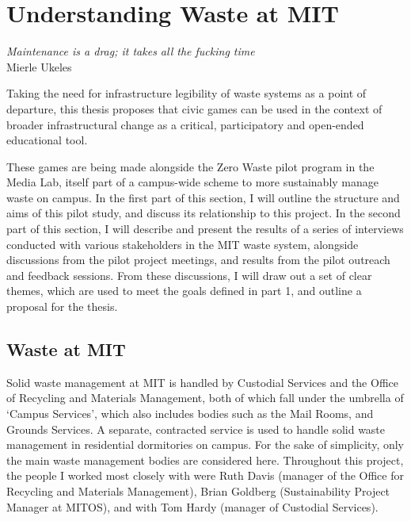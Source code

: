 \documentclass[nofonts,nols,justified,nobib]{tufte-book}
\begin{document}


\chapter{Understanding Waste at MIT}

\begin{flushright}
\emph{Maintenance is a drag; it takes all the fucking time} \cite{ukeles_manifesto_1969}\\
Mierle Ukeles
\end{flushright}

Taking the need for infrastructure legibility of waste systems as a point of departure, this thesis proposes that civic games can be used in the context of broader infrastructural change as a critical, participatory and open-ended educational tool.

These games are being made alongside the Zero Waste pilot program in the Media Lab, itself part of a campus-wide scheme to more sustainably manage waste on campus. In the first part of this section, I will outline the structure and aims of this pilot study, and discuss its relationship to this project. In the second part of this section, I will describe and present the results of a series of interviews conducted with various stakeholders in the MIT waste system, alongside discussions from the pilot project meetings, and results from the pilot outreach and feedback sessions. From these discussions, I will draw out a set of clear themes, which are used to meet the goals defined in part 1, and outline a proposal for the thesis.

\newpage

\section*{Waste at MIT}

Solid waste management at MIT is handled by Custodial Services and the Office of Recycling and Materials Management, both of which fall under the umbrella of `Campus Services', which also includes bodies such as the Mail Rooms, and Grounds Services. A separate, contracted service is used to handle solid waste management in residential dormitories on campus. For the sake of simplicity, only the main waste management bodies are considered here. Throughout this project, the people I worked most closely with were Ruth Davis (manager of the Office for Recycling and Materials Management), Brian Goldberg (Sustainability Project Manager at MITOS), and with Tom Hardy (manager of Custodial Services).
\end{document}
